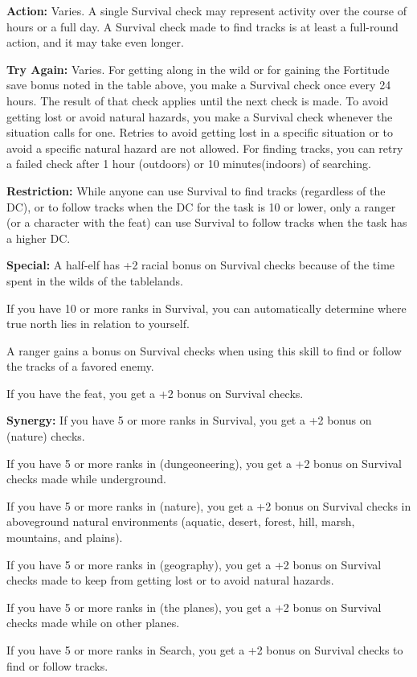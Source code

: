 \textbf{Action:} Varies. A single Survival check may represent activity over the course of hours or a full day. A Survival check made to find tracks is at least a full-round action, and it may take even longer.

\textbf{Try Again:} Varies. For getting along in the wild or for gaining the Fortitude save bonus noted in the table above, you make a Survival check once every 24 hours. The result of that check applies until the next check is made. To avoid getting lost or avoid natural hazards, you make a Survival check whenever the situation calls for one. Retries to avoid getting lost in a specific situation or to avoid a specific natural hazard are not allowed. For finding tracks, you can retry a failed check after 1 hour (outdoors) or 10 minutes(indoors) of searching.

\textbf{Restriction:} While anyone can use Survival to find tracks (regardless of the DC), or to follow tracks when the DC for the task is 10 or lower, only a ranger (or a character with the  feat) can use Survival to follow tracks when the task has a higher DC.

\textbf{Special:} A half-elf has +2 racial bonus on Survival checks because of the time spent in the wilds of the tablelands.

If you have 10 or more ranks in Survival, you can automatically determine where true north lies in relation to yourself.

A ranger gains a bonus on Survival checks when using this skill to find or follow the tracks of a favored enemy.

If you have the  feat, you get a +2 bonus on Survival checks.

\textbf{Synergy:} If you have 5 or more ranks in Survival, you get a +2 bonus on  (nature) checks.

If you have 5 or more ranks in  (dungeoneering), you get a +2 bonus on Survival checks made while underground.

If you have 5 or more ranks in  (nature), you get a +2 bonus on Survival checks in aboveground natural environments (aquatic, desert, forest, hill, marsh, mountains, and plains).

If you have 5 or more ranks in  (geography), you get a +2 bonus on Survival checks made to keep from getting lost or to avoid natural hazards.

If you have 5 or more ranks in  (the planes), you get a +2 bonus on Survival checks made while on other planes.

If you have 5 or more ranks in Search, you get a +2 bonus on Survival checks to find or follow tracks.

